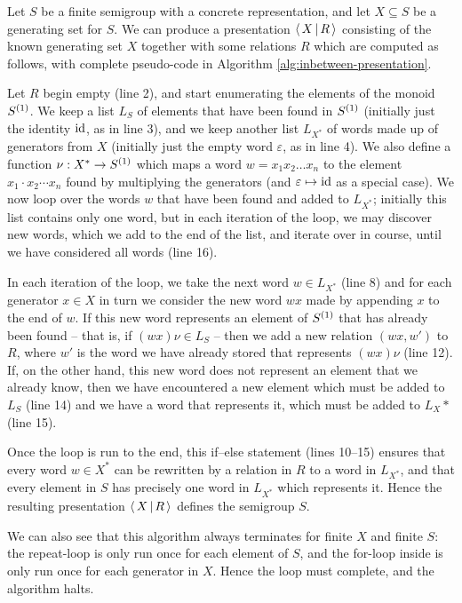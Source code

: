 \begin{method}
  \label{meth:inbetween-presentation}
  Let $S$ be a finite semigroup with a concrete representation, and let
  $X \subseteq S$ be a generating set for $S$.  We can produce a presentation
  $\left\langle \, X \, \middle| \, R \, \right\rangle$ consisting of the known generating set $X$ together with some
  relations $R$ which are computed as follows, with complete pseudo-code in
  Algorithm \ref{alg:inbetween-presentation}.

  Let $R$ begin empty (line 2), and start enumerating the elements of the monoid $S^{(1)}{}$.
  We keep a list $L_S$ of elements that have been found in $S^{(1)}{}$ (initially just
  the identity $\operatorname{id}$, as in line 3), and we keep another
  list $L_{X^*}$ of words made up of generators from $X$ (initially just the
  empty word $\varepsilon$, as in line 4).  We also define a
  function $\nu : X^* \to S^{(1)}{}$ which maps a word $w=x_1x_2\ldots x_n$ to the
  element $x_1\cdot x_2\cdots x_n$ found by multiplying the generators (and
  $\varepsilon \mapsto \operatorname{id}$ as a special case).
  We now loop over the words $w$ that have been found and added to $L_{X^*}$;
  initially this list contains only one word, but in each iteration of the loop,
  we may discover new words, which we add to the end of the list, and iterate
  over in course, until we have considered all words (line 16).

  In each iteration of the loop, we take the next word $w \in L_{X^*}$ (line 8)
  and for each generator $x \in X$ in turn we consider the new word $wx$ made by
  appending $x$ to the end of $w$.  If this new word represents an element of
  $S^{(1)}{}$ that has already been found -- that is, if $(wx)\nu \in L_S$ -- then we
  add a new relation $(wx, w')$ to $R$, where $w'$ is the word we have already
  stored that represents $(wx)\nu$ (line 12).  If, on the other hand, this new
  word does not represent an element that we already know, then we have
  encountered a new element which must be added to $L_S$ (line 14) and we have a
  word that represents it, which must be added to $L_X*$ (line 15).

  Once the loop is run to the end, this if--else statement (lines 10--15)
  ensures that every word $w \in X^*$ can be rewritten by a relation in $R$ to a
  word in $L_{X^*}$, and that every element in $S$ has precisely one word in
  $L_{X^*}$ which represents it.
  Hence the resulting presentation $\left\langle \, X \, \middle| \, R \, \right\rangle$ defines the semigroup $S$.

  We can also see that this algorithm always terminates for finite $X$ and
  finite $S$: the repeat-loop is only run once for each element of $S$, and the
  for-loop inside is only run once for each generator in $X$.  Hence the loop
  must complete, and the algorithm halts.
\end{method}

